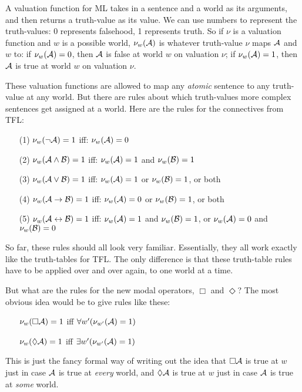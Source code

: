 A valuation function for ML takes in a sentence and a world as its arguments, and then returns a truth-value as its value. We can use numbers to represent the truth-values: 0 represents falsehood, 1 represents truth. So if $\nu$ is a valuation function and $w$ is a possible world, $\nu_w(\mathcal{A})$ is whatever truth-value $\nu$ maps $\mathcal{A}$ and $w$ to: if $\nu_w(\mathcal{A})=0$, then $\mathcal{A}$ is false at world $w$ on valuation $\nu$; if $\nu_w(\mathcal{A})=1$, then $\mathcal{A}$ is true at world $w$ on valuation $\nu$.

These valuation functions are allowed to map any \emph{atomic} sentence to any truth-value at any world. But there are rules about which truth-values more complex sentences get assigned at a world. Here are the rules for the connectives from TFL:
\begin{itemize}
\item[(1)]$\nu_w(\neg\mathcal{A})=1$ iff: $\nu_w(\mathcal{A})=0$
\item[(2)]$\nu_w(\mathcal{A}\wedge\mathcal{B})=1$ iff: $\nu_w(\mathcal{A})=1$ and $\nu_w(\mathcal{B})=1$
\item[(3)]$\nu_w(\mathcal{A}\vee\mathcal{B})=1$ iff: $\nu_w(\mathcal{A})=1$ or $\nu_w(\mathcal{B})=1$, or both
\item[(4)]$\nu_w(\mathcal{A}\rightarrow\mathcal{B})=1$ iff: $\nu_w(\mathcal{A})=0$ or $\nu_w(\mathcal{B})=1$, or both
\item[(5)]$\nu_w(\mathcal{A}\leftrightarrow\mathcal{B})=1$ iff: $\nu_w(\mathcal{A})=1$ and $\nu_w(\mathcal{B})=1$, or $\nu_w(\mathcal{A})=0$ and $\nu_w(\mathcal{B})=0$
\end{itemize}
So far, these rules should all look very familiar. Essentially, they all work exactly like the truth-tables for TFL. The only difference is that these truth-table rules have to be applied over and over again, to one world at a time.

But what are the rules for the new modal operators, $\Box$ and $\Diamond$? The most obvious idea would be to give rules like these:
\begin{itemize}
\item[]$\nu_w(\Box \mathcal{A})=1$ iff $\forall w' (\nu_{w'}(\mathcal{A})=1)$
\item[]$\nu_w(\Diamond \mathcal{A})=1$ iff $\exists w' (\nu_{w'}(\mathcal{A})=1)$
\end{itemize}
This is just the fancy formal way of writing out the idea that $\Box\mathcal{A}$ is true at $w$ just in case $\mathcal{A}$ is true at \emph{every} world, and $\Diamond\mathcal{A}$ is true at $w$ just in case $\mathcal{A}$ is true at \emph{some} world.


